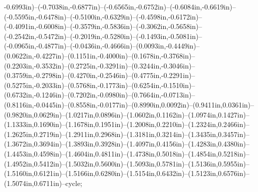 -0.6993in)--(-0.7038in,-0.6877in)--(-0.6565in,-0.6752in)--(-0.6084in,-0.6619in)--(-0.5595in,-0.6478in)--(-0.5100in,-0.6329in)--(-0.4598in,-0.6172in)--(-0.4091in,-0.6008in)--(-0.3579in,-0.5836in)--(-0.3062in,-0.5658in)--(-0.2542in,-0.5472in)--(-0.2019in,-0.5280in)--(-0.1493in,-0.5081in)--(-0.0965in,-0.4877in)--(-0.0436in,-0.4666in)--(0.0093in,-0.4449in)--(0.0622in,-0.4227in)--(0.1151in,-0.4000in)--(0.1678in,-0.3768in)--(0.2203in,-0.3532in)--(0.2725in,-0.3291in)--(0.3244in,-0.3046in)--(0.3759in,-0.2798in)--(0.4270in,-0.2546in)--(0.4775in,-0.2291in)--(0.5275in,-0.2033in)--(0.5768in,-0.1773in)--(0.6254in,-0.1510in)--(0.6732in,-0.1246in)--(0.7202in,-0.0980in)--(0.7664in,-0.0713in)--(0.8116in,-0.0445in)--(0.8558in,-0.0177in)--(0.8990in,0.0092in)--(0.9411in,0.0361in)--(0.9820in,0.0629in)--(1.0217in,0.0896in)--(1.0602in,0.1162in)--(1.0974in,0.1427in)--(1.1333in,0.1690in)--(1.1678in,0.1951in)--(1.2008in,0.2210in)--(1.2324in,0.2466in)--(1.2625in,0.2719in)--(1.2911in,0.2968in)--(1.3181in,0.3214in)--(1.3435in,0.3457in)--(1.3672in,0.3694in)--(1.3893in,0.3928in)--(1.4097in,0.4156in)--(1.4283in,0.4380in)--(1.4453in,0.4598in)--(1.4604in,0.4811in)--(1.4738in,0.5018in)--(1.4854in,0.5218in)--(1.4952in,0.5412in)--(1.5032in,0.5600in)--(1.5093in,0.5781in)--(1.5136in,0.5955in)--(1.5160in,0.6121in)--(1.5166in,0.6280in)--(1.5154in,0.6432in)--(1.5123in,0.6576in)--(1.5074in,0.6711in)--cycle;
